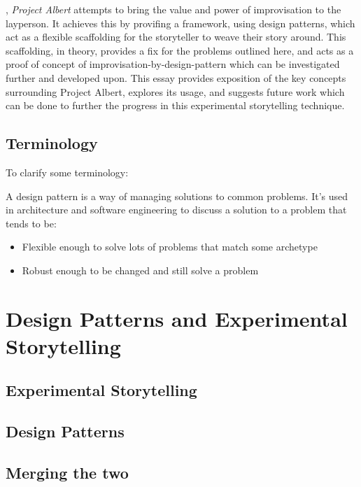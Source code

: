 \documentclass{tufte-handout}
\begin{document}
, \emph{Project Albert} attempts to bring the value and power of improvisation to the layperson. It achieves this by provifing a framework, using design patterns, which act as a flexible scaffolding for the storyteller to weave their story around. This scaffolding, in theory, provides a fix for the problems outlined here, and acts as a proof of concept of improvisation-by-design-pattern which can be investigated further and developed upon. This essay provides exposition of the key concepts surrounding Project Albert, explores its usage, and suggests future work which can be done to further the progress in this experimental storytelling technique.

\subsection{Terminology}
To clarify some terminology:
\begin{description}[align=right,labelwidth=3cm]
    \item [Design Pattern:] A design pattern is a way of managing solutions to common problems. It's used in architecture and software engineering to discuss a solution to a problem that tends to be:
		\begin{itemize}
			\item Flexible enough to solve lots of problems that match some archetype
			\item Robust enough to be changed and still solve a problem
        \end{itemize}\end{description}


\section{Design Patterns and Experimental Storytelling}

\subsection{Experimental Storytelling}

\subsection{Design Patterns}

\subsection{Merging the two}
\end{document}
